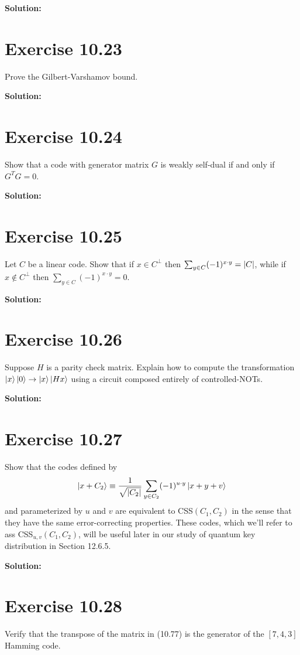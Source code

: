 \documentclass{book}
\begin{document}
    \textbf{Solution:}

\section*{Exercise 10.23}
    Prove the Gilbert-Varshamov bound. 

    \textbf{Solution:}

\section*{Exercise 10.24}
    Show that a code with generator matrix $G$ is weakly self-dual if and only if $G^T G = 0$. 

    \textbf{Solution:}

\section*{Exercise 10.25}
    Let $C$ be a linear code. Show that if $x \in C^\perp$ then $\sum_{y\in C} (-1)^{x\cdot y} = \abs{C}$, while if $x \notin C^\perp$ then $\sum_{y\in C} (-1)^{x\cdot y} = 0$.

    \textbf{Solution:}

\section*{Exercise 10.26}
    Suppose $H$ is a parity check matrix. Explain how to compute the transformation $\ket{x}\ket{0} \to \ket{x}\ket{Hx}$ using a circuit composed entirely of controlled-NOTs. 

    \textbf{Solution:}

\section*{Exercise 10.27}
    Show that the codes defined by
    \begin{align}
        \ket{x+C_2} \equiv \frac{1}{\sqrt{\abs{C_2}}} \sum_{y\in C_2} (-1)^{u\cdot y} \ket{x+y+v}
    \end{align}
    and parameterized by $u$ and $v$ are equivalent to CSS$(C_1, C_2)$ in the sense that they have the same error-correcting properties. These codes, which we'll refer to ass CSS$_{u,v}(C_1, C_2)$, will be useful later in our study of quantum key distribution in Section 12.6.5.

    \textbf{Solution:}

\section*{Exercise 10.28}
    Verify that the transpose of the matrix in (10.77) is the generator of the $[7,4,3]$ Hamming code. 
\end{document}
